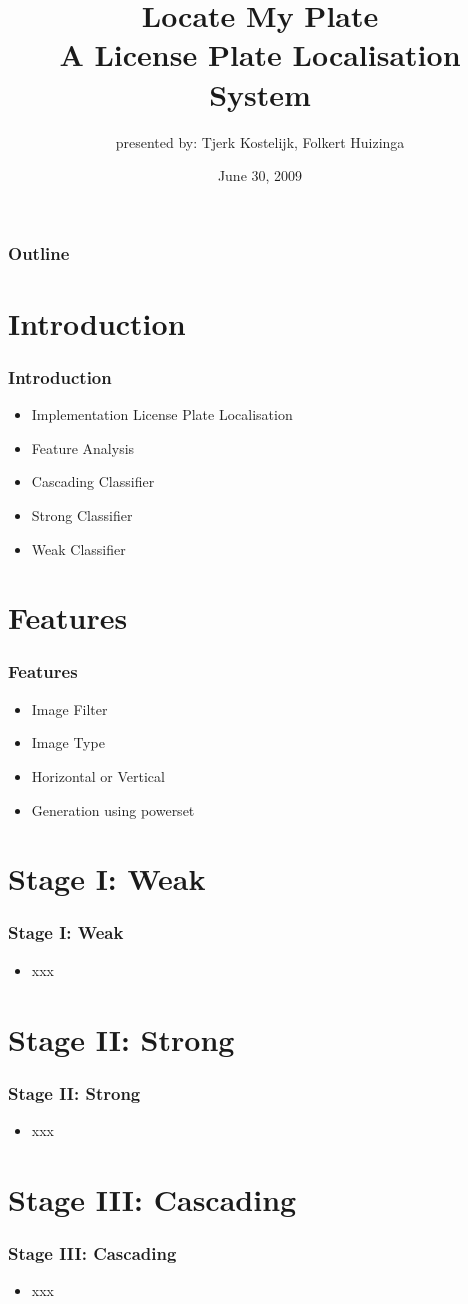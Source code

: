 \documentclass{beamer}
\title{Locate My Plate \\ A License Plate Localisation System}
\subtitle{presented by: Tjerk Kostelijk, Folkert Huizinga}
\date{June 30, 2009}
\begin{document}
\frame{\titlepage}

\setcounter{tocdepth}{1}

\frame
{
  \frametitle{Outline}
  \small
  \tableofcontents
  \normalsize
}

\setcounter{tocdepth}{2}

\section{Introduction}
\frame
{
  \frametitle{Introduction}
	
  \begin{itemize}
  \item <+-| alert@+> Implementation License Plate Localisation
  \item <+-| alert@+> Feature Analysis
  \item <+-| alert@+> Cascading Classifier
  \item <+-| alert@+> Strong Classifier
  \item <+-| alert@+> Weak Classifier
  \end{itemize}
}

\section{Features}
\frame
{
  \frametitle{Features}
	
  \begin{itemize}
  \item <+-| alert@+> Image Filter
  \item <+-| alert@+> Image Type
  \item <+-| alert@+> Horizontal or Vertical
  \item <+-| alert@+> Generation using powerset
  \end{itemize}
}

\section{Stage I: Weak}
\frame
{
  \frametitle{Stage I: Weak}
	
  \begin{itemize}
  \item <+-| alert@+> xxx
  \end{itemize}
}

\section{Stage II: Strong}
\frame
{
  \frametitle{Stage II: Strong}
	
  \begin{itemize}
  \item <+-| alert@+> xxx
  \end{itemize}
}

\section{Stage III: Cascading}
\frame
{
  \frametitle{Stage III: Cascading}
	
  \begin{itemize}
  \item <+-| alert@+> xxx
  \end{itemize}
}

\end{document}
